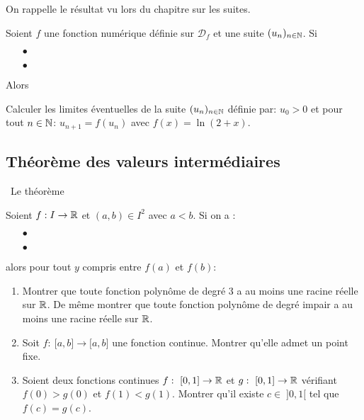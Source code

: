 \documentclass[a4paper, 11pt]{article}
\begin{document}
{\noindent On rappelle le r\'esultat vu lors du chapitre sur les suites.\\

{\noindent

\begin{prop}
	Soient $f$ une fonction num\'erique d\'efinie sur $\mathcal{D}_f$ et une suite $(u_n)_{n\in \mathbb{N}}$. Si \vsec
	\begin{itemize}
		\item[$\bullet$] \dotfill\vsec
		\item[$\bullet$] \dotfill \vsec
	\end{itemize}
	Alors \dotfill\vsec
\end{prop}

}

{\footnotesize \begin{exercice}
	Calculer les limites \'eventuelles de la suite $(u_n)_{n\in \mathbb{N}}$ d\'efinie par: $u_0>0$ et pour tout $n\in\mathbb{N}$: $u_{n+1}=f(u_n)$ avec $f(x)=\ln{(2+x)}$.%
\end{exercice}}


\subsection{Th\'eor\`eme des valeurs interm\'ediaires}

\noindent\ {Le th\'eor\`{e}me}\\

{\noindent

\begin{theorem}
	Soient $f: I\rightarrow \mathbb{R}$ et $(a,b)\in I^2$ avec $a<b$. Si on a :\vsec
	\begin{itemize}
		\item[$\bullet$] \dotfill \vsec
		\item[$\bullet$] \dotfill \vsec
	\end{itemize}
	alors pour tout $y$ compris entre $f(a)$ et $f(b)$: \dotfill \vsec
\end{theorem}


{\footnotesize \begin{exercice}
	\begin{enumerate}
		\item Montrer que toute fonction polyn\^ome de degr\'e 3 a au moins une racine r\'eelle sur $\mathbb{R}$. De m\^{e}me montrer que toute fonction polyn\^ome de degr\'e impair a au moins une racine r\'eelle sur $\mathbb{R}$.
		\item Soit $f:\ \lbrack a,b\rbrack\rightarrow \lbrack a,b\rbrack $ une fonction continue. Montrer qu'elle admet un point fixe.
		\item Soient deux fonctions continues $f:\ \lbrack 0,1\rbrack\rightarrow \R$ et $g:\ \lbrack 0,1\rbrack\rightarrow \mathbb{R}$ v\'erifiant $f(0)>g(0)$ et $f(1)<g(1)$. Montrer qu'il existe $c\in \; \rbrack 0,1\lbrack$ tel que $f(c)=g(c)$.
	\end{enumerate}
\end{exercice}}


}}
\end{document}
